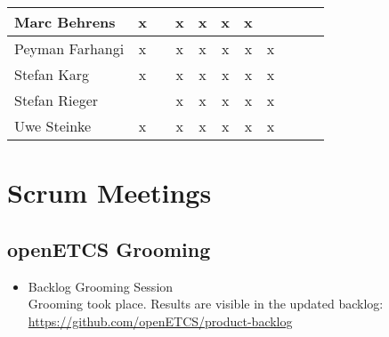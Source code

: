 \documentclass[a4paper, 11pt]{article}
\begin{document}
\begin{tabular}{|l|c|c|c|c||c|c|c||c|c|c|}
Marc Behrens         & x &   & x & x & x & x &   \\\hline
Peyman Farhangi      & x  &   & x & x & x & x & x  \\\hline
Stefan Karg          & x  &   & x  & x & x & x & x \\\hline
Stefan Rieger        &   &  & x & x & x & x &x  \\\hline
Uwe Steinke          & x &   & x & x & x & x & x \\\hline
\end{tabular}


\section{Scrum Meetings}

\subsection{openETCS Grooming}
\begin{itemize}
\item Backlog Grooming Session\\
Grooming took place. Results are visible in the updated backlog:\\
\url{https://github.com/openETCS/product-backlog}

\end{itemize}
\end{document}

